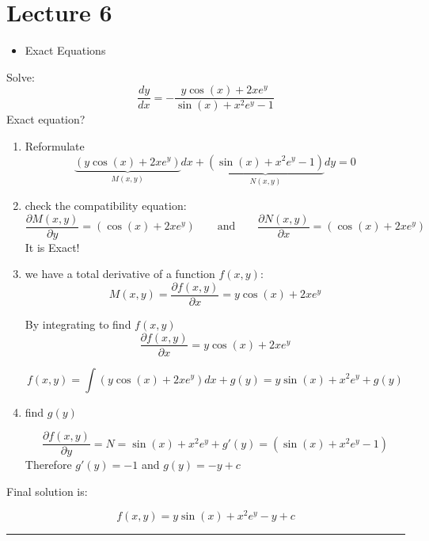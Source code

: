 \chapter*{Lecture 6}
\begin{recall}{}{}
\begin{itemize}
\item Exact Equations
\end{itemize}
\end{recall}

\begin{exmp}{}
Solve:
\begin{equation*}
\frac{dy}{dx}=-\frac{y\cos(x)+2xe^{y}}{\sin(x)+x^{2}e^{y}-1}
\end{equation*}
Exact equation?
\begin{enumerate}
\item Reformulate
\begin{equation*}
\underbrace{(y\cos(x)+2xe^{y})}_{M(x,y)}{dx}+\underbrace{(\sin(x)+x^{2}e^{y}-1)}_{N(x,y)}dy=0
\end{equation*}
\item  check the compatibility equation:
\begin{equation*}
\frac{\partial M(x,y)}{\partial y}=(\cos(x)+2xe^{y}) \qquad \text{and}\qquad \frac{\partial N(x,y)}{\partial x}=(\cos(x)+2xe^{y}) 
\end{equation*}
It is Exact!
\item  we have a total derivative of a function $f(x,y)$:
\begin{equation*}
M(x,y) = \frac{\partial f(x,y)}{\partial x}=y\cos(x)+2xe^{y}
\end{equation*}

By integrating to find $f(x,y)$
\begin{equation*}
 \frac{\partial f(x,y)}{\partial x}=y\cos(x)+2xe^{y}
\end{equation*}

\begin{equation*}
 f(x,y)=\int (y\cos(x)+2xe^{y})dx+g(y)=y\sin(x)+x^2e^{y}+g(y)
\end{equation*}
\item find $g(y)$

\begin{equation*}
 \frac{\partial f(x,y)}{\partial y}=N=\sin(x)+x^2e^{y}+g'(y)=(\sin(x)+x^{2}e^{y}-1)
\end{equation*}
Therefore $g'(y)=-1$ and $g(y)=-y +c$
\end{enumerate}
\item Final solution is:

\begin{equation*}
 \boxed{f(x,y)=y\sin(x)+x^2e^{y}-y+c}
\end{equation*}
\end{exmp}
\begin{center}
\noindent\rule{4cm}{0.4pt}
\end{center}




